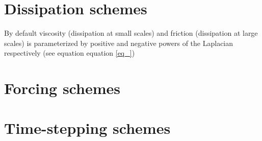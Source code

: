 \section{Dissipation schemes} 
\label{ssec_Dschemes}
By default viscosity (dissipation at small scales) and friction
(dissipation at large scales) is parameterized by positive and
negative powers of the Laplacian respectively 
(see equation equation \ref{eq_})
 


\section{Forcing schemes}
\label{ssec_Fschemes}



\section{Time-stepping schemes}
\label{ssec_Tschemes}
